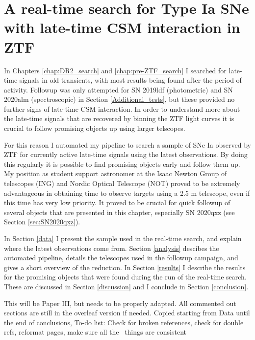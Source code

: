 \documentclass[a4paper,oneside,12pt, class=Latex/Classes/PhDthesisPSnPDF, crop=false]{standalone}
\begin{document}
\doublespacing
\chapter{A real-time search for Type Ia SNe with late-time CSM interaction in ZTF}
\label{chap:Real-time}
In Chapters \ref{chap:DR2_search} and \ref{chap:pre-ZTF_search} I searched for late-time signals in old transients, with most results being found after the period of activity. Followup was only attempted for SN 2019ldf (photometric) and SN 2020alm (spectroscopic) in Section \ref{Additional_tests}, but these provided no further signs of late-time CSM interaction. In order to understand more about the late-time signals that are recovered by binning the ZTF light curves it is crucial to follow promising objects up using larger telscopes.

For this reason I automated my pipeline to search a sample of SNe Ia observed by ZTF for currently active late-time signals using the latest observations. By doing this regularly it is possible to find promising objects early and follow them up. My position as student support astronomer at the Isaac Newton Group of telescopes (ING) and Nordic Optical Telescope (NOT) proved to be extremely advantageous in obtaining time to observe targets using a 2.5 m telescope, even if this time has very low priority. It proved to be crucial for quick followup of several objects that are presented in this chapter, especially SN 2020qxz (see Section \ref{sec:SN2020qxz}).

In Section \ref{data} I present the sample used in the real-time search, and explain where the latest observations come from. Section \ref{analysis} descibes the automated pipeline, details the telescopes used in the followup campaign, and gives a short overview of the reduction. In Section \ref{results} I describe the results for the promising objects that were found during the run of the real-time search. These are discussed in Section \ref{discussion} and I conclude in Section \ref{conclusion}.

\color{red} This will be Paper III, but needs to be properly adapted. All commented out sections are still in the overleaf version if needed. Copied starting from Data until the end of conclusions, To-do list: Check for broken references, check for double refs, reformat pages, make sure all the \ztfg\ztfr\ztfi\ things are consistent\color{black}
\end{document}
